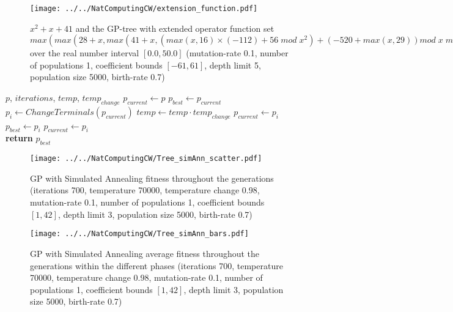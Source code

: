 \documentclass[11pt,a4paper]{article}
\begin{document}
\begin{appendices}
\begin{figure}[h]
\centering
\texttt{[image: ../../NatComputingCW/extension\_function.pdf]} 
\caption{$x^2 + x +41$ and the GP-tree with extended operator function set $max(max(28 + x, max(41 + x, (max(x, 16)×(-112) + 56 \;mod\; x^2) + (-520 + max(x, 29)) mod \; x \; mod \;2\; mod \;(51 x))) + x^2, max(15 x, x \;mod \;53 \;mod\; max(11, x)) + (x - 46))$ over the real number interval $[0.0, 50.0]$ (mutation-rate 0.1, number of populations 1, coefficient bounds $[-61, 61]$, depth limit 5, population size 5000, birth-rate 0.7)}
\label{fig:extension_function_2}
\end{figure}

\begin{algorithm}[h]
\begin{algorithmic}
    $p$, $iterations$, $temp$, $temp_{change}$
   \STATE $p_{current} \leftarrow p$
   \STATE $p_{best} \leftarrow p_{current}$
   \STATE $p_i \leftarrow ChangeTerminals(p_{current})$
   \STATE $temp \leftarrow temp \cdot temp_{change}$
       \STATE $p_{current} \leftarrow p_i$
           \STATE $p_{best} \leftarrow p_i$
       \ENDIF
   	   \STATE $p_{current} \leftarrow p_i$
   \ENDIF
   \ENDFOR \\
   \textbf{return} $p_{best}$
\end{algorithmic}
  \caption{Simulated Annealing}
  \label{alg:SimAnn}
\end{algorithm}

\begin{figure}[h]
\centering
\texttt{[image: ../../NatComputingCW/Tree\_simAnn\_scatter.pdf]} 
\caption{GP with Simulated Annealing fitness throughout the generations (iterations 700, temperature 70000, temperature change 0.98, mutation-rate 0.1, number of populations 1, coefficient bounds $[1, 42]$, depth limit 3, population size 5000, birth-rate 0.7)}
\label{fig:simAnn_1}
\end{figure}

\begin{figure}[h]
\centering
\texttt{[image: ../../NatComputingCW/Tree\_simAnn\_bars.pdf]} 
\caption{GP with Simulated Annealing average fitness throughout the generations within the different phases (iterations 700, temperature 70000, temperature change 0.98, mutation-rate 0.1, number of populations 1, coefficient bounds $[1, 42]$, depth limit 3, population size 5000, birth-rate 0.7)}
\label{fig:simAnn_2}
\end{figure}


\end{appendices}
\end{document}

